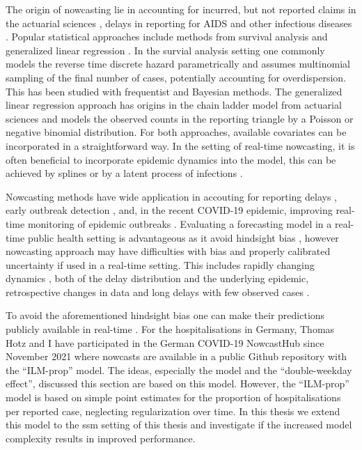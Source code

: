 The origin of nowcasting lie in accounting for incurred, but not reported claims in the actuarial sciences \cite{Kaminsky1987Prediction}, delays in reporting for AIDS \cite{Zeger1989Statistical,Lawless1994Adjustments} and other infectious diseases \cite{Farrington1996Statistical}. Popular statistical approaches include methods from survival analysis \cite{Lawless1994Adjustments} and generalized linear regression \cite{Zeger1989Statistical}. In the survial analysis setting one commonly models the reverse time discrete hazard parametrically and assumes multinomial sampling of the final number of cases, potentially accounting for overdispersion. This has been studied with frequentist \cite{Midthune2005Modeling} and Bayesian \cite{Hohle2014Bayesian,AnDerHeiden2020Schatzung} methods. The generalized linear regression approach has origins in the chain ladder model from actuarial sciences \cite{Renshaw1998Stochastic} and models the observed counts in the reporting triangle by a Poisson or negative binomial distribution.
For both approaches, available covariates can be incorporated in a straightforward way. In the setting of real-time nowcasting, it is often beneficial to incorporate epidemic dynamics into the model, this can be achieved by splines \cite{Hohle2014Bayesian,vandeKassteele2019Nowcasting} or by a latent process of infections \cite{McGough2020Nowcasting}.

Nowcasting methods have wide application in accouting for reporting delays \cite{Midthune2005Modeling}, early outbreak detection \cite{Salmon2015Bayesian,Bastos2019Modelling}, and, in the recent COVID-19 epidemic, improving real-time monitoring of epidemic outbreaks \cite{AnDerHeiden2020Schatzung,Gunther2021Nowcasting,Schneble2021Nowcasting,Akhmetzhanov2021Estimation}. Evaluating a forecasting model in a real-time public health setting is advantageous as it avoid hindsight bias \cite{Desai2019Realtime}, however nowcasting approach may have difficulties with bias and properly calibrated uncertainty if used in a real-time setting. This includes rapidly changing dynamics \cite{Gunther2021Nowcasting,vandeKassteele2019Nowcasting}, both of the delay distribution and the underlying epidemic, retrospective changes in data \cite{Midthune2005Modeling} and long delays with few observed cases \cite{Noufaily2015Modelling}. 

To avoid the aforementioned hindsight bias one can make their predictions publicly available in real-time \cite{Ray2020Ensemble,Bracher2021Preregistered}. For the hospitalisations in Germany, Thomas Hotz and I have participated in the German COVID-19 NowcastHub \cite{2022Nowcasts} since November 2021 where nowcasts are available in a public Github repository \cite{2022Hospitalization} with the ``ILM-prop'' model. The ideas, especially the model and the ``double-weekday effect'', discussed this section are based on this model. However, the ``ILM-prop'' model is based on simple point estimates for the proportion of hospitalisations per reported case, neglecting regularization over time. In this thesis we extend this model to the \gls{ssm} setting of this thesis and investigate if the increased model complexity results in improved performance.

